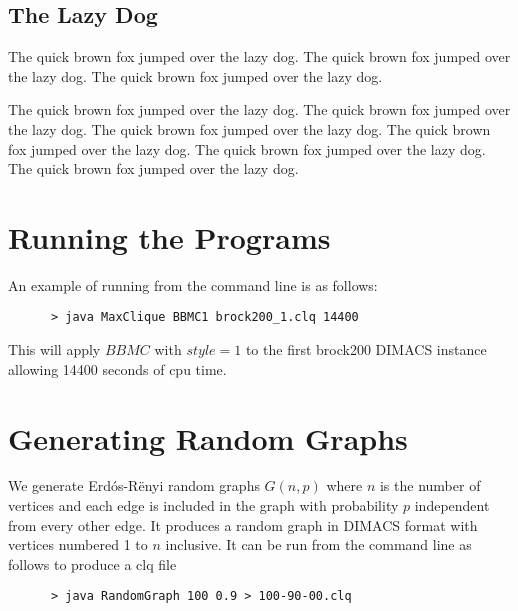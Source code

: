 \documentclass{l4proj}
\begin{document}
\section{The Lazy Dog}
The quick brown fox jumped over the lazy dog.
The quick brown fox jumped over the lazy dog.
The quick brown fox jumped over the lazy dog.

The quick brown fox jumped over the lazy dog.
The quick brown fox \cite{am97} jumped over the lazy dog.
The quick brown fox jumped over the lazy dog.
The quick brown fox jumped over the lazy dog.
The quick brown fox jumped over the lazy dog.
The quick brown fox jumped over the lazy dog.

\begin{appendices}

\chapter{Running the Programs}
An example of running from the command line is as follows:
\begin{verbatim}
      > java MaxClique BBMC1 brock200_1.clq 14400
\end{verbatim}
This will apply $BBMC$ with $style = 1$ to the first brock200 DIMACS instance allowing 14400 seconds of cpu time.

\chapter{Generating Random Graphs}
\label{sec:randomGraph}
We generate Erd\'{o}s-R\"{e}nyi random graphs $G(n,p)$ where $n$ is the number of vertices and
each edge is included in the graph with probability $p$ independent from every other edge. It produces
a random graph in DIMACS format with vertices numbered 1 to $n$ inclusive. It can be run from the command line as follows to produce 
a clq file
\begin{verbatim}
      > java RandomGraph 100 0.9 > 100-90-00.clq
\end{verbatim}
\end{appendices}




\end{document}
